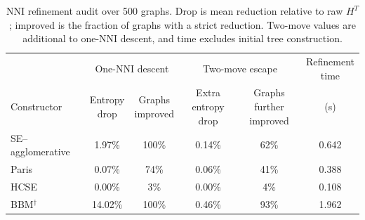 \begin{table}[t]
\centering\small
\caption{NNI refinement audit over 500 graphs. Drop is mean reduction relative
to raw $H^T$; improved is the fraction of graphs with a strict reduction.
Two-move values are additional to one-NNI descent, and time excludes initial
tree construction.}
\label{tab:operator}
\begin{tabular*}{\textwidth}{@{\extracolsep{\fill}}lccccc@{}}
\toprule
& \multicolumn{2}{c}{One-NNI descent}
& \multicolumn{2}{c}{Two-move escape}
& \shortstack{Refinement\\time} \\
\cmidrule(lr){2-3}\cmidrule(lr){4-5}
Constructor
& \shortstack{Entropy\\drop}
& \shortstack{Graphs\\improved}
& \shortstack{Extra entropy\\drop}
& \shortstack{Graphs further\\improved}
& (s) \\
\midrule
SE--agglomerative & 1.97\% & 100\% & 0.14\% & 62\% & 0.642 \\
Paris & 0.07\% & 74\% & 0.06\% & 41\% & 0.388 \\
HCSE & 0.00\% & 3\% & 0.00\% & 4\% & 0.108 \\
BBM$^\dagger$ & 14.02\% & 100\% & 0.46\% & 93\% & 1.962 \\
\bottomrule
\end{tabular*}
\end{table}
